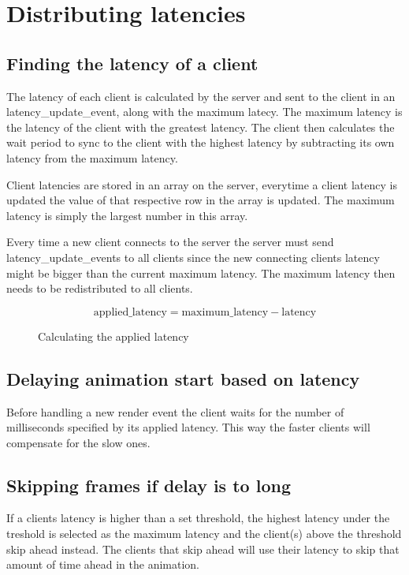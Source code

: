 \section{Distributing latencies}

\subsection{Finding the latency of a client}
The latency of each client is calculated by the server and sent to the client in an latency\_update\_event, along with the maximum latecy. The maximum latency is the latency of the client with the greatest latency. The client then calculates the wait period to sync to the client with the highest latency by subtracting its own latency from the maximum latency.

Client latencies are stored in an array on the server, everytime a client latency is updated the value of that respective row in the array is updated. The maximum latency is simply the largest number in this array.

Every time a new client connects to the server the server must send latency\_update\_events to all clients since the new connecting clients latency might be bigger than the current maximum latency. The maximum latency then needs to be redistributed to all clients. 

\begin{figure}[h!]
	\begin{displaymath}
		\text{applied\_latency} = \text{maximum\_latency} - \text{latency}
	\end{displaymath}
	\caption{Calculating the applied latency}
	\label{fig:applatency}
\end{figure} 

\subsection{Delaying animation start based on latency}
Before handling a new render event the client waits for the number of milliseconds specified by its applied latency. This way the faster clients will compensate for the slow ones. 

\subsection{Skipping frames if delay is to long}
If a clients latency is higher than a set threshold, the highest latency under the treshold is selected as the maximum latency and the client(s) above the threshold skip ahead instead. The clients that skip ahead will use their latency to skip that amount of time ahead in the animation. 


